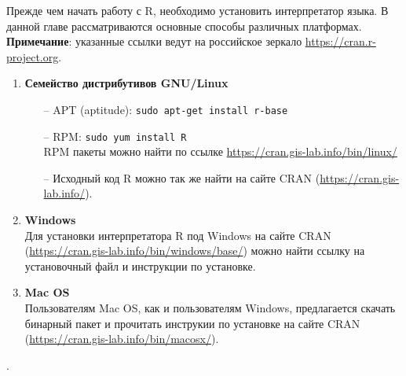     Прежде чем начать работу с R, необходимо установить интерпретатор языка. В данной главе рассматриваются 
    основные способы различных платформах. \textbf{Примечание}: указанные ссылки ведут на 
    российское зеркало \url{https://cran.r-project.org}.

    \begin{enumerate}
        \item \textbf{Семейство дистрибутивов GNU/Linux}
            \begin{itemize}
                \item[--] APT (aptitude):
                    \texttt{sudo apt-get install r-base}
                
                \item[--] RPM:
                    \texttt{sudo yum install R} \\
                    RPM пакеты можно найти по ссылке \url{https://cran.gis-lab.info/bin/linux/}
                
                \item[--] Исходный код R можно так же найти на сайте CRAN (\url{https://cran.gis-lab.info/}).
            \end{itemize}
        
        \item \textbf{Windows} \\
            Для установки интерпретатора R под Windows на сайте CRAN (\url{https://cran.gis-lab.info/bin/windows/base/})
            можно найти ссылку на установочный файл и инструкции по установке.
        
        \item \textbf{Mac OS} \\
            Пользователям Mac OS, как и пользователям Windows, предлагается скачать бинарный пакет и прочитать инструкии
            по установке на сайте CRAN (\url{https://cran.gis-lab.info/bin/macosx/}).
    \end{enumerate} 
    .
